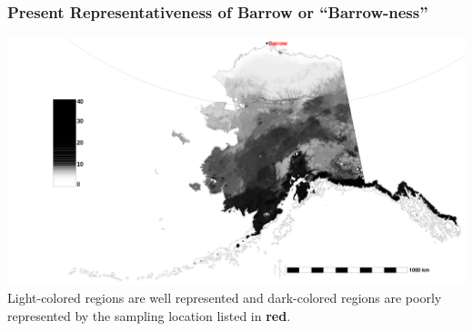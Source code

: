 \begin{frame}
 \frametitle{Present Representativeness of Barrow or ``Barrow-ness''}

 \includegraphics[width=\textwidth]{ngee_figures/alaska_2000_2009_dem_Feb2012_k1000ness_1sites.pdf} \\
  \vbox{\scriptsize\hfill\citep{Hoffman_LandscapeEcol_20131001}}
\medskip
Light-colored regions are well represented and dark-colored regions are
poorly represented by the sampling location listed in \textbf{\color{red}red}.

\end{frame}
%
%
%
